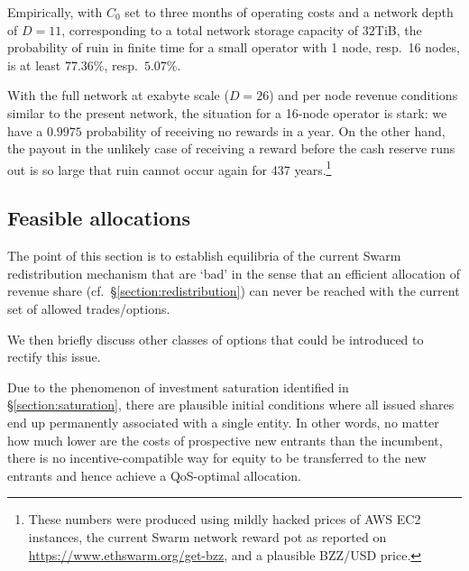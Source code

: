     


\begin{example}

Empirically, with $C_0$ set to three months of operating costs and a network depth of $D=11$, corresponding to a total network storage capacity of $32$TiB, the probability of ruin in finite time for a small operator with 1 node, resp.~16 nodes, is at least $77.36\%$, resp.~$5.07\%$.
    
With the full network at exabyte scale ($D=26$) and per node revenue conditions similar to the present network, the situation for a 16-node operator is stark: we have a $0.9975$ probability of receiving no rewards in a year.
%
On the other hand, the payout in the unlikely case of receiving a reward before the cash reserve runs out is so large that ruin cannot occur again for 437 years.\footnote{These numbers were produced using mildly hacked prices of AWS EC2 instances, the current Swarm network reward pot as reported on \url{https://www.ethswarm.org/get-bzz}, and a plausible BZZ/USD price.}

\end{example}

\subsection{Feasible allocations}
\label{section:feasible}

\begin{notes}

  \item The point of this section is to establish equilibria of the current Swarm redistribution mechanism that are `bad' in the sense that an efficient allocation of revenue share (cf.~\S\ref{section:redistribution}) can never be reached with the current set of allowed trades/options.

  \item We then briefly discuss other classes of options that could be introduced to rectify this issue.

\end{notes}

Due to the phenomenon of investment saturation identified in \S\ref{section:saturation}, there are plausible initial conditions where all issued shares end up permanently associated with a single entity.
%
In other words, no matter how much lower are the costs of prospective new entrants than the incumbent, there is no incentive-compatible way for equity to be transferred to the new entrants and hence achieve a QoS-optimal allocation.

